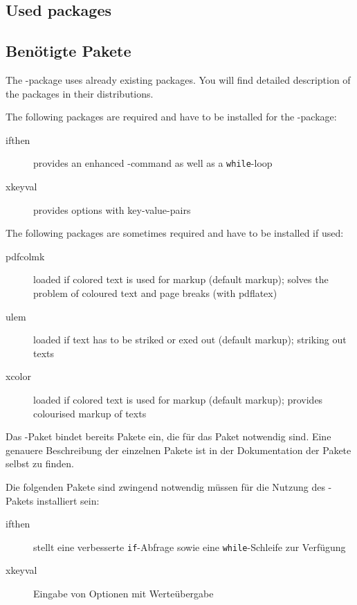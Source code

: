 \ifENGLISH
	\subsection{Used packages}
\fi
	\ifGERMAN
		\subsection{Benötigte Pakete}
	\fi
\label{sec:user:packages}

\ifENGLISH
	The -package uses already existing packages.
	You will find detailed description of the packages in their distributions.

	The following packages are required and have to be installed for the -package:
	\begin{description}
		\item [ifthen] provides an enhanced -command as well as a \texttt{while}-loop
		\item [xkeyval] provides options with key-value-pairs
	\end{description}

	The following packages are sometimes required and have to be installed if used:
	\begin{description}
		\item [pdfcolmk] loaded if colored text is used for markup (default markup); solves the problem of coloured text and page breaks (with pdflatex)
		\item [ulem] loaded if text has to be striked or exed out (default markup); striking out texts
		\item [xcolor] loaded if colored text is used for markup (default markup); provides colourised markup of texts
	\end{description}
\fi
	\ifGERMAN
		Das -Paket bindet bereits Pakete ein, die für das Paket notwendig sind.
		Eine genauere Beschreibung der einzelnen Pakete ist in der Dokumentation der Pakete selbst zu finden.

		Die folgenden Pakete sind zwingend notwendig müssen für die Nutzung des -Pakets installiert sein:
		\begin{description}
			\item [ifthen] stellt eine verbesserte \texttt{if}-Abfrage sowie eine \texttt{while}-Schleife zur Verfügung
			\item [xkeyval] Eingabe von Optionen mit Werteübergabe
		\end{description}

